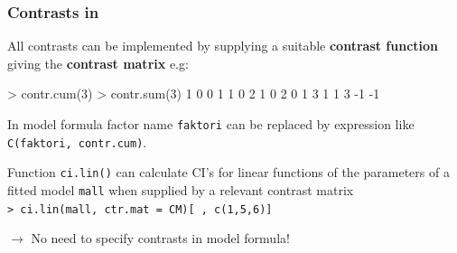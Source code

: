 \documentclass[12pt,dvipsnames,t,handout%
,aspectratio=169%
]{beamer}
\begin{document}
\begin{frame}[fragile]

\frametitle{Contrasts in \R}

\bi
\item
All contrasts can be implemented by supplying a suitable
{\bf contrast function} giving the {\bf contrast matrix} e.g:
{\small
\begin{semiverbatim}
{> contr.cum(3)}        {> contr.sum(3)}
1 0 0                  1    1   0    
2 1 0                  2    0   1   
3 1 1                  3   -1  -1   
\end{semiverbatim}
}
\medskip
\item
In model formula factor name {\tt faktori} can be replaced by expression
like \verb+C(faktori, contr.cum)+.
\medskip
\item 
Function \texttt{ci.lin()} can calculate CI's for
linear functions of the parameters of a fitted
model {\tt mall} when supplied by a relevant contrast matrix \\
\verb|> ci.lin(mall, ctr.mat = CM)[ , c(1,5,6)]|

\medskip
$\to$ No need to specify contrasts in model formula!
\ei
\end{frame}
\end{document}
